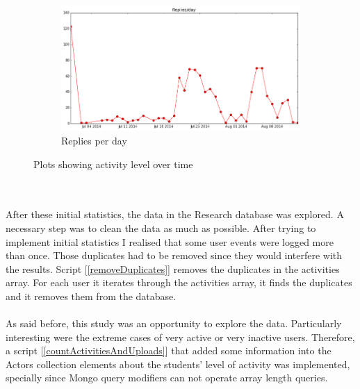 \documentclass[11pt, oneside]{article}   	%
\begin{document}
\begin{figure}
\begin{subfigure}[b]{0.45\textwidth}
                \includegraphics[width=\textwidth]{repliesPerDay.png}
                \caption{Replies per day}
                \label{repliesPerDay}
        \end{subfigure}
        \caption{Plots showing activity level over time}
        \label{figure:activityLevel}
\end{figure}
\\\\After these initial statistics, the data in the Research database was explored. A necessary step was to clean the data as much as possible. After trying to implement initial statistics I realised that some user events were logged more than once. Those duplicates had to be removed since they would interfere with the results. Script [\ref{removeDuplicates}] removes the duplicates in the activities array. For each user it iterates through the activities array, it finds the duplicates and it removes them from the database.\\\\ 
As said before, this study was an opportunity to explore the data. Particularly interesting were the extreme cases of very active or very inactive users. Therefore, a script [\ref{countActivitiesAndUploads}] that added some information into the Actors collection elements about the students' level of activity was implemented, specially since Mongo query modifiers can not operate array length queries.\\\\ 
\end{document}
